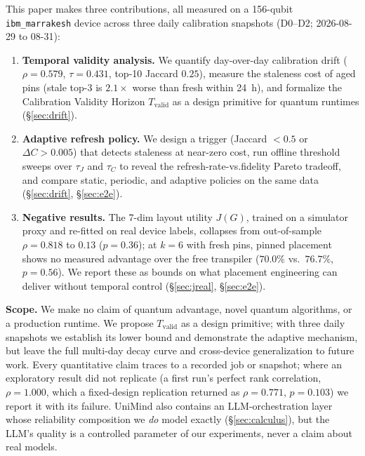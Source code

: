 \documentclass[journal,10pt,twocolumn]{IEEEtran}
\begin{document}
This paper makes three contributions, all measured on a 156-qubit \texttt{ibm\_marrakesh} device across three
daily calibration snapshots (D0--D2; 2026-08-29 to 08-31):
\begin{enumerate}[leftmargin=1.8em,itemsep=1pt,topsep=2pt]
\item \textbf{Temporal validity analysis.} We quantify day-over-day calibration drift
($\rho{=}0.579$, $\tau{=}0.431$, top-10 Jaccard $0.25$), measure the staleness cost of aged pins
(stale top-3 is $2.1\times$ worse than fresh within 24~h), and formalize the Calibration Validity
Horizon $T_{\mathrm{valid}}$ as a design primitive for quantum runtimes (\S\ref{sec:drift}).
\item \textbf{Adaptive refresh policy.} We design a trigger (Jaccard $<0.5$ or $\Delta C{>}0.005$)
that detects staleness at near-zero cost, run offline threshold sweeps over $\tau_J$ and $\tau_C$ to
reveal the refresh-rate-vs.\-fidelity Pareto tradeoff, and compare static, periodic, and adaptive
policies on the same data (\S\ref{sec:drift}, \S\ref{sec:e2e}).
\item \textbf{Negative results.} The 7-dim layout utility $J(G)$, trained on a simulator proxy and
re-fitted on real device labels, collapses from out-of-sample $\rho{=}0.818$ to $0.13$
($p{=}0.36$); at $k{=}6$ with fresh pins, pinned placement shows no measured advantage over the
free transpiler ($70.0\%$ vs.\ $76.7\%$, $p{=}0.56$). We report these as bounds on what placement
engineering can deliver without temporal control (\S\ref{sec:jreal}, \S\ref{sec:e2e}).
\end{enumerate}

\noindent\textbf{Scope.} We make no claim of quantum advantage, novel quantum algorithms, or a production runtime.
We propose $T_{\mathrm{valid}}$ as a design primitive; with three daily snapshots we establish its lower bound and
demonstrate the adaptive mechanism, but leave the full multi-day decay curve and cross-device generalization to
future work. Every quantitative claim traces to a recorded job or snapshot; where an exploratory result did
not replicate (a first run's perfect rank correlation, $\rho{=}1.000$, which a fixed-design replication returned as
$\rho{=}0.771$, $p{=}0.103$) we report it with its failure. UniMind also contains an LLM-orchestration layer whose
reliability composition we \emph{do} model exactly (\S\ref{sec:calculus}), but the LLM's quality is a controlled
parameter of our experiments, never a claim about real models.

\end{document}
